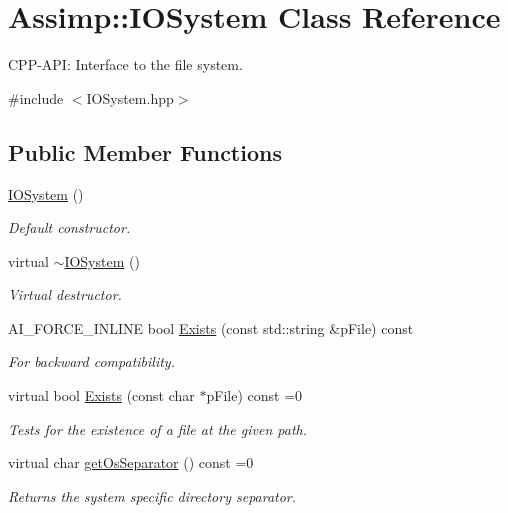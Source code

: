 \hypertarget{classAssimp_1_1IOSystem}{\section{\-Assimp\-:\-:\-I\-O\-System \-Class \-Reference}
\label{classAssimp_1_1IOSystem}
}


\-C\-P\-P-\/\-A\-P\-I\-: \-Interface to the file system.  




{\ttfamily \#include $<$\-I\-O\-System.\-hpp$>$}

\subsection*{\-Public \-Member \-Functions}
\begin{DoxyCompactItemize}
\item 
\hyperlink{classAssimp_1_1IOSystem_af8ba1ee2dc0686da8fc9e3dad49af801}{\-I\-O\-System} ()
\begin{DoxyCompactList}\small\item\em \-Default constructor. \end{DoxyCompactList}\item 
virtual \hyperlink{classAssimp_1_1IOSystem_a617417f1c5125770606fea3b41068b36}{$\sim$\-I\-O\-System} ()
\begin{DoxyCompactList}\small\item\em \-Virtual destructor. \end{DoxyCompactList}\item 
\-A\-I\-\_\-\-F\-O\-R\-C\-E\-\_\-\-I\-N\-L\-I\-N\-E bool \hyperlink{classAssimp_1_1IOSystem_a7ae6cfaea4957408967463bfc3b84b27}{\-Exists} (const std\-::string \&p\-File) const 
\begin{DoxyCompactList}\small\item\em \-For backward compatibility. \end{DoxyCompactList}\item 
virtual bool \hyperlink{classAssimp_1_1IOSystem_a79f5fe8d2dbe1056c9418f7de9a72445}{\-Exists} (const char $\ast$p\-File) const =0
\begin{DoxyCompactList}\small\item\em \-Tests for the existence of a file at the given path. \end{DoxyCompactList}\item 
virtual char \hyperlink{classAssimp_1_1IOSystem_a40e412875b985bdb638f00ef0f20fff6}{get\-Os\-Separator} () const =0
\begin{DoxyCompactList}\small\item\em \-Returns the system specific directory separator. \end{DoxyCompactList}\item 

\end{DoxyCompactItemize}
